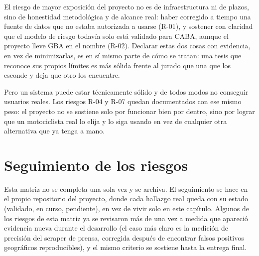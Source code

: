 El riesgo de mayor exposición del proyecto no es de infraestructura ni
de plazos, sino de honestidad metodológica y de alcance real: haber
corregido a tiempo una fuente de datos que no estaba autorizada a usarse
(R-01), y sostener con claridad que el modelo de riesgo todavía solo
está validado para CABA, aunque el proyecto lleve GBA en el nombre
(R-02). Declarar estas dos cosas con evidencia, en vez de minimizarlas,
es en sí mismo parte de cómo se tratan: una tesis que reconoce sus
propios límites es más sólida frente al jurado que una que los esconde y
deja que otro los encuentre.

Pero un sistema puede estar técnicamente sólido y de todos modos no
conseguir usuarios reales. Los riesgos R-04 y R-07 quedan documentados
con ese mismo peso: el proyecto no se sostiene solo por funcionar bien
por dentro, sino por lograr que un motociclista real lo elija y lo siga
usando en vez de cualquier otra alternativa que ya tenga a mano.

\section{Seguimiento de los riesgos}

Esta matriz no se completa una sola vez y se archiva. El seguimiento se
hace en el propio repositorio del proyecto, donde cada hallazgo real
queda con su estado (validado, en curso, pendiente), en vez de vivir
solo en este capítulo. Algunos de los riesgos de esta matriz ya se
revisaron más de una vez a medida que apareció evidencia nueva durante
el desarrollo (el caso más claro es la medición de precisión del scraper
de prensa, corregida después de encontrar falsos positivos geográficos
reproducibles), y el mismo criterio se sostiene hasta la entrega final.
